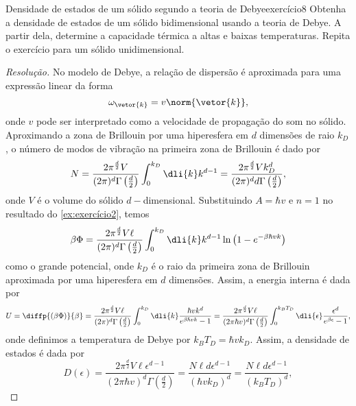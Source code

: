 \begin{exercício}{Densidade de estados de um sólido segundo a teoria de Debye}{exercício8}
    Obtenha a densidade de estados de um sólido bidimensional usando a teoria de Debye. A partir dela, determine a capacidade térmica a altas e baixas temperaturas. Repita o exercício para um sólido unidimensional.
\end{exercício}
\begin{proof}[Resolução]
    No modelo de Debye, a relação de dispersão é aproximada para uma expressão linear da forma
    \begin{equation*}
        \omega_{\vetor{k}} = v \norm{\vetor{k}},
    \end{equation*}
    onde \(v\) pode ser interpretado como a velocidade de propagação do som no sólido. Aproximando a zona de Brillouin por uma hiperesfera em \(d\) dimensões de raio \(k_D\), o número de modos de vibração na primeira zona de Brillouin é dado por
    \begin{equation*}
        N = \frac{2 \pi^{\frac{d}{2}}V}{(2\pi)^d \Gamma\left(\frac{d}{2}\right)} \int_0^{k_D} \dli{k} k^{d - 1} = \frac{2 \pi^{\frac{d}{2}} V k_D^d}{(2\pi)^d d \Gamma\left(\frac{d}{2}\right)},
    \end{equation*}
    onde \(V\) é o volume do sólido \(d-\)dimensional.
    Substituindo \(A = \hbar v\) e \(n = 1\) no resultado do \cref{ex:exercício2}, temos
    \begin{equation*}
        \beta \Phi = \frac{2\pi^{\frac{d}{2}} V \ell}{(2\pi)^d \Gamma\left(\frac{d}{2}\right)} \int_0^{k_D} \dli{k} k^{d - 1} \ln\left(1 - e^{- \beta \hbar v k}\right)
    \end{equation*}
    como o grande potencial, onde \(k_D\) é o raio da primeira zona de Brillouin aproximada por uma hiperesfera em \(d\) dimensões. Assim, a energia interna é dada por
    \begin{equation*}
        U = \diffp{(\beta \Phi)}{\beta} = \frac{2\pi^{\frac{d}{2}} V \ell}{(2\pi)^d \Gamma\left(\frac{d}{2}\right)} \int_0^{k_D} \dli{k} \frac{\hbar v k^d}{e^{\beta \hbar v k} - 1} = \frac{2 \pi^{\frac{d}{2}} V \ell}{(2\pi \hbar v)^d \Gamma\left(\frac{d}{2}\right)} \int_0^{k_B T_D} \dli{\epsilon} \frac{\epsilon^d}{e^{\beta \epsilon} - 1},
    \end{equation*}
    onde definimos a temperatura de Debye por \(k_B T_D = \hbar v k_D\). Assim, a densidade de estados é dada por
    \begin{equation*}
        D(\epsilon) = \frac{2 \pi^{\frac{d}{2}} V\ell \epsilon^{d - 1}}{(2\pi \hbar v)^d \Gamma\left(\frac{d}{2}\right)} = \frac{N \ell d \epsilon^{d - 1}}{(\hbar v k_D)^d} = \frac{N \ell d \epsilon^{d - 1}}{(k_B T_D)^d},

\end{equation*}
\end{proof}
